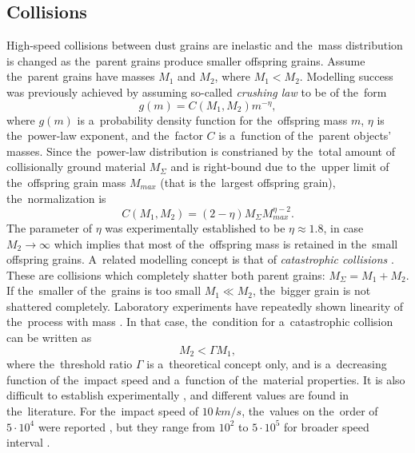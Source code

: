 \subsection{Collisions} \label{ch:collisions}

High-speed collisions between dust grains are inelastic and the~mass distribution is changed as the~parent grains produce smaller offspring grains. Assume the~parent grains have masses $M_1$ and $M_2$, where $M_1 < M_2$. Modelling success was previously achieved \citep{gault1963spray,dohnanyi1969collisional} by assuming so-called \textit{crushing law} to be of the~form
\begin{equation}
    g(m) = C(M_1,M_2)m^{-\eta},
    \label{eq:crushing_law}
\end{equation}
where $g(m)$ is a~probability density function for the~offspring mass $m$, $\eta$ is the~power-law exponent, and the~factor $C$ is a~function of the~parent objects' masses. Since the~power-law distribution is constrianed by the~total amount of collisionally ground material $M_\Sigma$ and is right-bound due to the~upper limit of the~offspring grain mass $M_{max}$ (that is the~largest offspring grain), the~normalization is
\begin{equation}
    C(M_1,M_2) = (2-\eta) M_\Sigma M_{max}^{\eta -2}.
\end{equation}
The parameter of $\eta$ was experimentally established \citep{gault1963spray} to be $\eta \approx 1.8$, in case $M_2 \rightarrow \infty$ which implies that most of the~offspring mass is retained in the~small offspring grains. 
A~related modelling concept is that of \textit{catastrophic collisions} \citep{dohnanyi1969collisional,grun1985collisional}. These are collisions which completely shatter both parent grains: $M_\Sigma = M_1 + M_2$. If the~smaller of the~grains is too small $M_1 \ll M_2$, the~bigger grain is not shattered completely. Laboratory experiments have repeatedly shown linearity of the~process with mass \citep{gault1963spray,dietzel1973heos,grun1984impact,mcbride1999meteoroid,collette2014micrometeoroid,shen2021cosmic}. In that case, the~condition for a~catastrophic collision can be written as 
\begin{equation}
    M_2 < \Gamma M_1,
\end{equation}
where the~threshold ratio $\Gamma$ is a~theoretical concept only, and is a~decreasing function of the~impact speed and a~function of the~material properties. It is also difficult to establish experimentally \citep{grun1985collisional}, and different values are found in the~literature. For the~impact speed of $10 \, \si{km/s}$, the~values on the~order of $5 \cdot 10^{4}$ were reported \citep{gault1969destruction,fujiwara1977destruction}, but they range from $10^2$ to $5\cdot 10^5$ for broader speed interval \citep{whipple1967maintaining,zook1975source,dohnanyi1978particle}. 
